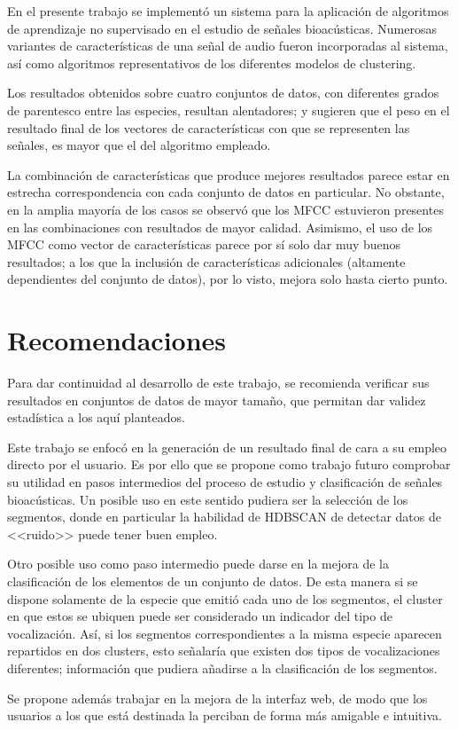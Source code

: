 En el presente trabajo se implementó un sistema para la aplicación de algoritmos de aprendizaje no supervisado en el estudio de señales bioacústicas.
Numerosas variantes de características de una señal de audio fueron incorporadas al sistema, así como algoritmos representativos de los diferentes modelos de clustering.

Los resultados obtenidos sobre cuatro conjuntos de datos, con diferentes grados de parentesco entre las especies, resultan alentadores;
y sugieren que el peso en el resultado final de los vectores de características con que se representen las señales, es mayor que el del algoritmo empleado.

La combinación de características que produce mejores resultados parece estar en estrecha correspondencia con cada conjunto de datos en particular.
No obstante, en la amplia mayoría de los casos se observó que los MFCC estuvieron presentes en las combinaciones con resultados de mayor calidad.
Asimismo, el uso de los MFCC como vector de características parece por sí solo dar muy buenos resultados;
a los que la inclusión de características adicionales (altamente dependientes del conjunto de datos), por lo visto, mejora solo hasta cierto punto.

\section*{Recomendaciones}\label{sec:recomendaciones}

Para dar continuidad al desarrollo de este trabajo, se recomienda verificar sus resultados en conjuntos de datos de mayor tamaño, que permitan dar validez estadística a los aquí planteados.

Este trabajo se enfocó en la generación de un resultado final de cara a su empleo directo por el usuario.
Es por ello que se propone como trabajo futuro comprobar su utilidad en pasos intermedios del proceso de estudio y clasificación de señales bioacústicas.
Un posible uso en este sentido pudiera ser la selección de los segmentos, donde en particular la habilidad de HDBSCAN de detectar datos de <<ruido>> puede tener buen empleo.

Otro posible uso como paso intermedio puede darse en la mejora de la clasificación de los elementos de un conjunto de datos.
De esta manera si se dispone solamente de la especie que emitió cada uno de los segmentos, el cluster en que estos se ubiquen puede ser considerado un indicador del tipo de vocalización.
Así, si los segmentos correspondientes a la misma especie aparecen repartidos en dos clusters, esto señalaría que existen dos tipos de vocalizaciones diferentes;
información que pudiera añadirse a la clasificación de los segmentos.

Se propone además trabajar en la mejora de la interfaz web, de modo que los usuarios a los que está destinada la perciban de forma más amigable e intuitiva.